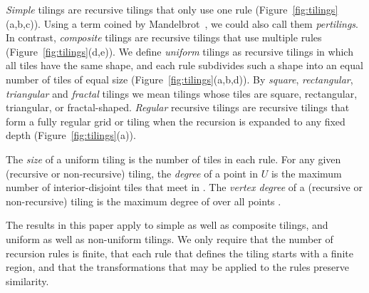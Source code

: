 \documentclass[11pt,a4paper]{article}
\newcommand{\unittile}{\ensuremath{U}\xspace}
\begin{document}
\emph{Simple} tilings are recursive tilings that only use one rule (Figure~\ref{fig:tilings}(a,b,c)). Using a term coined by Mandelbrot~\cite{Mandelbrot1983}, we could also call them \emph{pertilings}. In contrast, \emph{composite} tilings are recursive tilings that use multiple rules (Figure~\ref{fig:tilings}(d,e)).
We define \emph{uniform} tilings as recursive tilings in which all tiles have the same shape, and each rule subdivides such a shape into an equal number of tiles of equal size (Figure~\ref{fig:tilings}(a,b,d)).
By \emph{square}, \emph{rectangular}, \emph{triangular} and \emph{fractal} tilings we mean tilings whose tiles are square, rectangular, triangular, or fractal-shaped.
\emph{Regular} recursive tilings are recursive tilings that form a fully regular grid or tiling when the recursion is expanded to any fixed depth (Figure~\ref{fig:tilings}(a)).

The \emph{size} of a uniform tiling is the number of tiles in each rule.
For any given (recursive or non-recursive) tiling, the \emph{degree} of a point  in \unittile is the maximum number of interior-disjoint tiles that meet in .
The \emph{vertex degree} of a (recursive or non-recursive) tiling is the maximum degree of  over all points .

The results in this paper apply to simple as well as composite tilings, and uniform as well as non-uniform tilings. We only require that the number of recursion rules is finite, that each rule that defines the tiling starts with a finite region, and that the transformations that may be applied to the rules preserve similarity.
\end{document}
